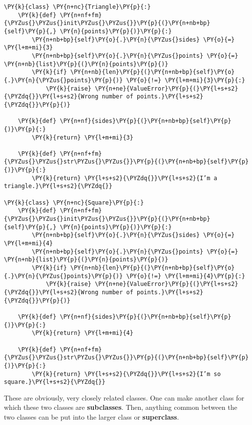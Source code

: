 \begin{Verbatim}[commandchars=\\\{\}]
\PY{k}{class} \PY{n+nc}{Triangle}\PY{p}{:}
    \PY{k}{def} \PY{n+nf+fm}{\PYZus{}\PYZus{}init\PYZus{}\PYZus{}}\PY{p}{(}\PY{n+nb+bp}{self}\PY{p}{,} \PY{n}{points}\PY{p}{)}\PY{p}{:}
        \PY{n+nb+bp}{self}\PY{o}{.}\PY{n}{\PYZus{}sides} \PY{o}{=} \PY{l+m+mi}{3}
        \PY{n+nb+bp}{self}\PY{o}{.}\PY{n}{\PYZus{}points} \PY{o}{=} \PY{n+nb}{list}\PY{p}{(}\PY{n}{points}\PY{p}{)}
        \PY{k}{if} \PY{n+nb}{len}\PY{p}{(}\PY{n+nb+bp}{self}\PY{o}{.}\PY{n}{\PYZus{}points}\PY{p}{)} \PY{o}{!=} \PY{l+m+mi}{3}\PY{p}{:}
            \PY{k}{raise} \PY{n+ne}{ValueError}\PY{p}{(}\PY{l+s+s2}{\PYZdq{}}\PY{l+s+s2}{Wrong number of points.}\PY{l+s+s2}{\PYZdq{}}\PY{p}{)}

    \PY{k}{def} \PY{n+nf}{sides}\PY{p}{(}\PY{n+nb+bp}{self}\PY{p}{)}\PY{p}{:}
        \PY{k}{return} \PY{l+m+mi}{3}

    \PY{k}{def} \PY{n+nf+fm}{\PYZus{}\PYZus{}str\PYZus{}\PYZus{}}\PY{p}{(}\PY{n+nb+bp}{self}\PY{p}{)}\PY{p}{:}
        \PY{k}{return} \PY{l+s+s2}{\PYZdq{}}\PY{l+s+s2}{I’m a triangle.}\PY{l+s+s2}{\PYZdq{}}

\PY{k}{class} \PY{n+nc}{Square}\PY{p}{:}
    \PY{k}{def} \PY{n+nf+fm}{\PYZus{}\PYZus{}init\PYZus{}\PYZus{}}\PY{p}{(}\PY{n+nb+bp}{self}\PY{p}{,} \PY{n}{points}\PY{p}{)}\PY{p}{:}
        \PY{n+nb+bp}{self}\PY{o}{.}\PY{n}{\PYZus{}sides} \PY{o}{=} \PY{l+m+mi}{4}
        \PY{n+nb+bp}{self}\PY{o}{.}\PY{n}{\PYZus{}points} \PY{o}{=} \PY{n+nb}{list}\PY{p}{(}\PY{n}{points}\PY{p}{)}
        \PY{k}{if} \PY{n+nb}{len}\PY{p}{(}\PY{n+nb+bp}{self}\PY{o}{.}\PY{n}{\PYZus{}points}\PY{p}{)} \PY{o}{!=} \PY{l+m+mi}{4}\PY{p}{:}
            \PY{k}{raise} \PY{n+ne}{ValueError}\PY{p}{(}\PY{l+s+s2}{\PYZdq{}}\PY{l+s+s2}{Wrong number of points.}\PY{l+s+s2}{\PYZdq{}}\PY{p}{)}

    \PY{k}{def} \PY{n+nf}{sides}\PY{p}{(}\PY{n+nb+bp}{self}\PY{p}{)}\PY{p}{:}
        \PY{k}{return} \PY{l+m+mi}{4}

    \PY{k}{def} \PY{n+nf+fm}{\PYZus{}\PYZus{}str\PYZus{}\PYZus{}}\PY{p}{(}\PY{n+nb+bp}{self}\PY{p}{)}\PY{p}{:}
        \PY{k}{return} \PY{l+s+s2}{\PYZdq{}}\PY{l+s+s2}{I’m so square.}\PY{l+s+s2}{\PYZdq{}}
\end{Verbatim}



These are obviously, very closely related classes.  One can make another class for which these two classes are \textbf{subclasses}.  Then, anything common between the two classes can be put into the larger class or \textbf{superclass}.

